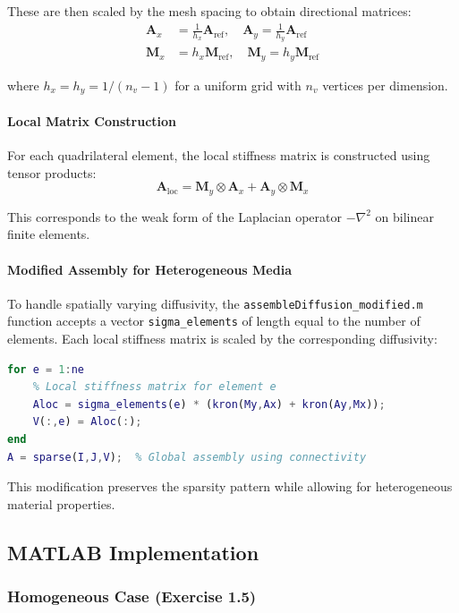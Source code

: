 These are then scaled by the mesh spacing to obtain directional matrices:
\begin{align}
\mathbf{A}_x &= \frac{1}{h_x} \mathbf{A}_{\text{ref}}, \quad \mathbf{A}_y = \frac{1}{h_y} \mathbf{A}_{\text{ref}} \\
\mathbf{M}_x &= h_x \mathbf{M}_{\text{ref}}, \quad \mathbf{M}_y = h_y \mathbf{M}_{\text{ref}}
\end{align}

where $h_x = h_y = 1/(n_v - 1)$ for a uniform grid with $n_v$ vertices per dimension.

\paragraph{Local Matrix Construction}
For each quadrilateral element, the local stiffness matrix is constructed using tensor products:
\begin{equation}
\mathbf{A}_{\text{loc}} = \mathbf{M}_y \otimes \mathbf{A}_x + \mathbf{A}_y \otimes \mathbf{M}_x
\end{equation}

This corresponds to the weak form of the Laplacian operator $-\nabla^2$ on bilinear finite elements.

\paragraph{Modified Assembly for Heterogeneous Media}
To handle spatially varying diffusivity, the \texttt{assembleDiffusion\_modified.m} function accepts a vector \texttt{sigma\_elements} of length equal to the number of elements. Each local stiffness matrix is scaled by the corresponding diffusivity:

\begin{lstlisting}[language=Matlab, caption=Element-wise diffusivity implementation]
for e = 1:ne
    % Local stiffness matrix for element e
    Aloc = sigma_elements(e) * (kron(My,Ax) + kron(Ay,Mx));
    V(:,e) = Aloc(:);
end
A = sparse(I,J,V);  % Global assembly using connectivity
\end{lstlisting}

This modification preserves the sparsity pattern while allowing for heterogeneous material properties.

\subsection{MATLAB Implementation}

\subsubsection{Homogeneous Case (Exercise 1.5)}

